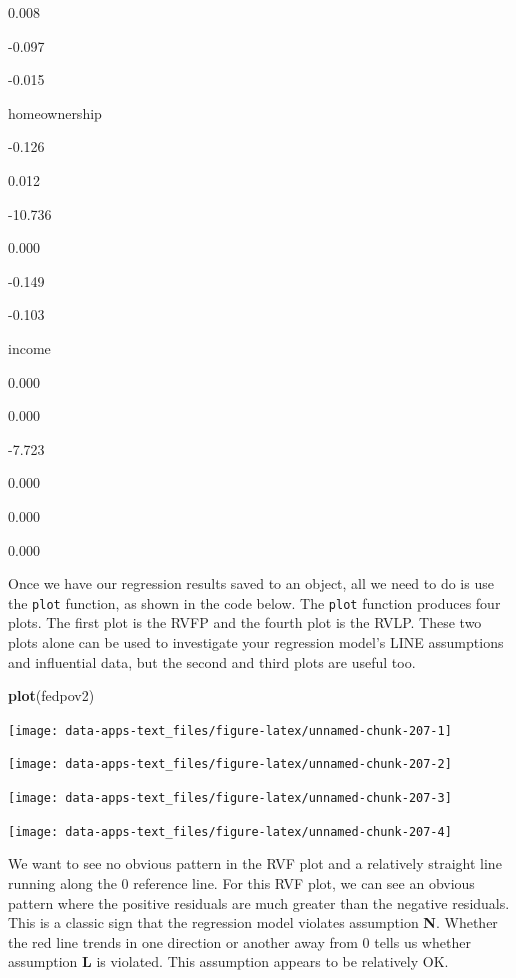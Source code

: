 \documentclass[
]{book}
\makeatletter
\newenvironment{Shaded}{\begin{snugshade}}{\end{snugshade}}
\newcommand{\FunctionTok}[1]{\textcolor[rgb]{0.27,0.27,0.27}{\textbf{#1}}}
\newcommand{\NormalTok}[1]{#1}
\newenvironment{kframe}{%
\medskip{}
\setlength{\fboxsep}{.8em}
 \def\at@end@of@kframe{}%
 \ifinner\ifhmode%
  \def\at@end@of@kframe{\end{minipage}}%
  \begin{minipage}{\columnwidth}%
 \fi\fi%
 \def\FrameCommand##1{\hskip\@totalleftmargin \hskip-\fboxsep
 \colorbox{shadecolor}{##1}\hskip-\fboxsep
     \hskip-\linewidth \hskip-\@totalleftmargin \hskip\columnwidth}%
 \MakeFramed {\advance\hsize-\width
   \@totalleftmargin\z@ \linewidth\hsize
   \@setminipage}}%
 {\par\unskip\endMakeFramed%
 \at@end@of@kframe}
\renewenvironment{Shaded}{\begin{kframe}}{\end{kframe}}
\makeatother
\begin{document}
0.008

-0.097

-0.015

homeownership

-0.126

0.012

-10.736

0.000

-0.149

-0.103

income

0.000

0.000

-7.723

0.000

0.000

0.000

Once we have our regression results saved to an object, all we need to do is use the \texttt{plot} function, as shown in the code below. The \texttt{plot} function produces four plots. The first plot is the RVFP and the fourth plot is the RVLP. These two plots alone can be used to investigate your regression model's LINE assumptions and influential data, but the second and third plots are useful too.

\begin{Shaded}
\begin{Highlighting}[]
\FunctionTok{plot}\NormalTok{(fedpov2)}
\end{Highlighting}
\end{Shaded}

\begin{center}\texttt{[image: data-apps-text\_files/figure-latex/unnamed-chunk-207-1]} \end{center}

\begin{center}\texttt{[image: data-apps-text\_files/figure-latex/unnamed-chunk-207-2]} \end{center}

\begin{center}\texttt{[image: data-apps-text\_files/figure-latex/unnamed-chunk-207-3]} \end{center}

\begin{center}\texttt{[image: data-apps-text\_files/figure-latex/unnamed-chunk-207-4]} \end{center}

We want to see no obvious pattern in the RVF plot and a relatively straight line running along the 0 reference line. For this RVF plot, we can see an obvious pattern where the positive residuals are much greater than the negative residuals. This is a classic sign that the regression model violates assumption \textbf{N}. Whether the red line trends in one direction or another away from 0 tells us whether assumption \textbf{L} is violated. This assumption appears to be relatively OK.
\end{document}

